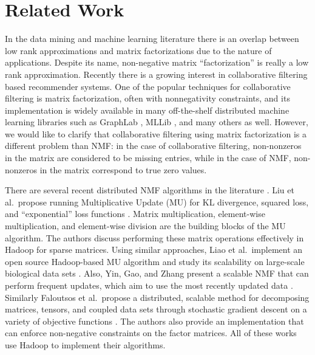 \section{Related Work}\label{sec:related}


In the data mining and machine learning literature there is an overlap between low rank approximations and matrix factorizations due to the nature of applications. 
Despite its name, non-negative matrix ``factorization'' is really a low rank approximation. 
Recently there is a growing interest in collaborative filtering based 
recommender systems. One of the popular techniques
for collaborative filtering is matrix factorization, often with nonnegativity constraints, 
and its implementation is widely available in many
off-the-shelf distributed machine learning libraries
such as GraphLab \cite{low2012}, MLLib \cite{meng2015mllib},
and many others \cite{satish2014,yun2014} as well.
However, we would like to clarify that collaborative
filtering using matrix factorization is a different problem than NMF: 
in the case of collaborative filtering, non-nonzeros in the matrix 
are considered to be missing entries, while in the case of NMF, non-nonzeros in the matrix correspond to true zero values.
 
There are several recent distributed NMF algorithms in the literature \cite{liao2014cloudnmf,Faloutsos2014,Yin2014,liu2010distributed}. 
Liu et al.\ propose running Multiplicative Update (MU) for KL divergence, squared loss, and ``exponential'' loss functions \cite{liu2010distributed}. 
Matrix multiplication, element-wise multiplication, and element-wise division are the building blocks of the MU algorithm. 
The authors discuss performing these matrix operations effectively in Hadoop for sparse matrices. 
Using similar approaches, Liao et al.\ implement an open source Hadoop-based MU algorithm and study its scalability on large-scale biological data sets \cite{liao2014cloudnmf}. 
Also, Yin, Gao, and Zhang present a scalable NMF that can perform frequent updates, which aim to use the most recently updated data \cite{Yin2014}. 
Similarly Faloutsos et al.\ propose a distributed, scalable method for decomposing matrices, tensors, and coupled data sets through stochastic gradient descent on a variety of objective functions \cite{Faloutsos2014}. 
The authors also provide an implementation that can enforce non-negative constraints on the factor matrices. 
All of these works use Hadoop to implement their algorithms.

